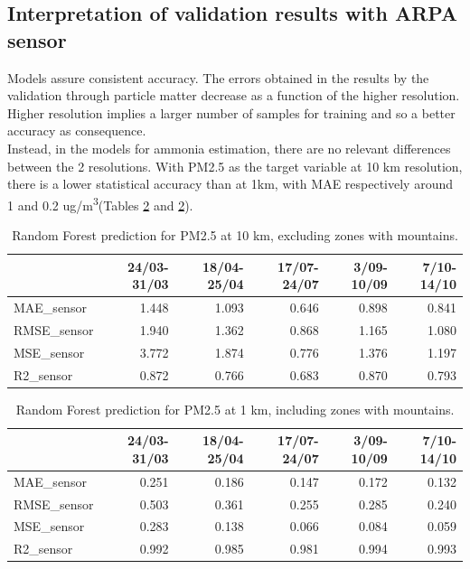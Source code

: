 \subsection{Interpretation of validation results with ARPA sensor}
Models assure consistent accuracy.
The errors obtained in the results by the validation through particle matter decrease as a function of the higher resolution.\\
Higher resolution implies a larger number of samples for training and so a better accuracy as consequence.\\
Instead, in the models for ammonia estimation, there are no relevant differences between the 2 resolutions.
With PM2.5 as the target variable at 10 km resolution, there is a lower statistical accuracy than at 1km, with MAE respectively around 1 and 0.2 ug/m\textsuperscript{3}(Tables \ref{tab:res1km}  and \ref{tab:res1km}). 
\begin{table}[H]
\begin{tabular}{lrrrrr}
\toprule
  &  24/03-31/03 &  18/04-25/04 &  17/07-24/07 &  3/09-10/09 &  7/10-14/10 \\
\midrule
  MAE\_sensor &        1.448 &        1.093 &        0.646 &       0.898 &       0.841 \\
RMSE\_sensor &        1.940 &        1.362 &        0.868 &       1.165 &       1.080 \\
 MSE\_sensor &        3.772 &        1.874 &        0.776 &       1.376 &       1.197 \\
  R2\_sensor &        0.872 &        0.766 &        0.683 &       0.870 &       0.793 \\
\bottomrule
\end{tabular}
\caption{Random Forest prediction for PM2.5 at 10 km, excluding zones with mountains.}
\label{tab:res10km}
\end{table}
\begin{table}[H]
\begin{tabular}{lrrrrr}
\toprule
  &  24/03-31/03 &  18/04-25/04 &  17/07-24/07 &  3/09-10/09 &  7/10-14/10 \\
\midrule
  MAE\_sensor &        0.251 &        0.186 &        0.147 &       0.172 &       0.132 \\
RMSE\_sensor &        0.503 &        0.361 &        0.255 &       0.285 &       0.240 \\
 MSE\_sensor &        0.283 &        0.138 &        0.066 &       0.084 &       0.059 \\
  R2\_sensor &        0.992 &        0.985 &        0.981 &       0.994 &       0.993 \\
\bottomrule
\end{tabular}
\caption{Random Forest prediction for PM2.5 at 1 km, including zones with mountains.}
\label{tab:res1km}
\end{table}

